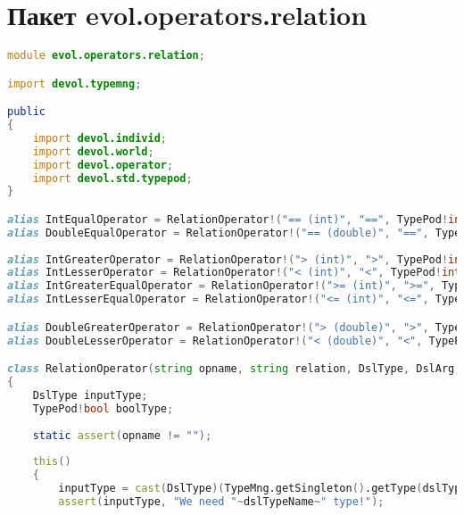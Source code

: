 \documentclass[russian,utf8,emptystyle]{eskdtext}
\begin{document}
\section{Пакет evol.operators.relation}
\begin{lstlisting}[language=D]
module evol.operators.relation;

import devol.typemng;

public
{
    import devol.individ;
    import devol.world;
    import devol.operator;
    import devol.std.typepod;
}

alias IntEqualOperator = RelationOperator!("== (int)", "==", TypePod!int, ArgPod!int, "Typeint", "Сравнение на равенство целочисленных аргументов.");
alias DoubleEqualOperator = RelationOperator!("== (double)", "==", TypePod!double, ArgPod!double, "Typedouble", "Сравнение на равенство действительных аргументов.");
    
alias IntGreaterOperator = RelationOperator!("> (int)", ">", TypePod!int, ArgPod!int, "Typeint", "Сравнение целочисленных аргументов. Возвращает ИСТИНА, если первый больше второго.");
alias IntLesserOperator = RelationOperator!("< (int)", "<", TypePod!int, ArgPod!int, "Typeint", "Сравнение целочисленных аргументов. Возвращает ИСТИНА, если первый меньше второго.");
alias IntGreaterEqualOperator = RelationOperator!(">= (int)", ">=", TypePod!int, ArgPod!int, "Typeint", "Сравнение целочисленных аргументов. Возвращает ИСТИНА, если первый больше второго или равен второму.");
alias IntLesserEqualOperator = RelationOperator!("<= (int)", "<=", TypePod!int, ArgPod!int, "Typeint", "Сравнение целочисленных аргументов. Возвращает ИСТИНА, если первый меньше второго или равен второму.");

alias DoubleGreaterOperator = RelationOperator!("> (double)", ">", TypePod!double, ArgPod!double, "Typedouble", "Сравнение действительных аргументов. Возвращает ИСТИНА, если первый больше второго.");
alias DoubleLesserOperator = RelationOperator!("< (double)", "<", TypePod!double, ArgPod!double, "Typedouble", "Сравнение действительных аргументов. Возвращает ИСТИНА, если первый меньше второго.");

class RelationOperator(string opname, string relation, DslType, DslArg, string dslTypeName, string description) : Operator
{
    DslType inputType;
    TypePod!bool boolType;
    
    static assert(opname != "");
    
    this()
    {
        inputType = cast(DslType)(TypeMng.getSingleton().getType(dslTypeName));
        assert(inputType, "We need "~dslTypeName~" type!");
        

\end{lstlisting}
\end{document}
